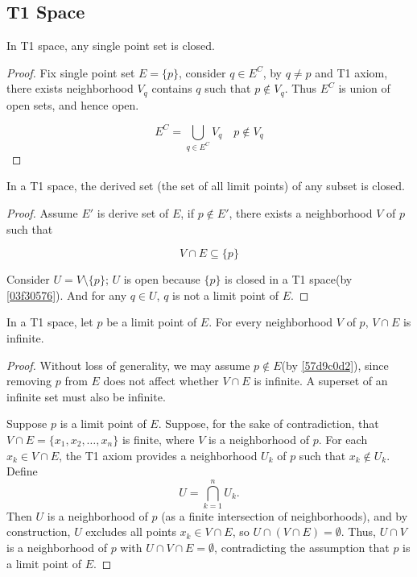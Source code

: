 \subsection{T1 Space}

\begin{thm}\label{03f30576}
    In T1 space, any single point set is closed.
\end{thm}

\begin{proof}
    Fix single point set $ E = \{ p \}$, consider $q \in E^C$, by $q \ne p$ and T1 axiom, there exists neighborhood $V_q$
    contains $q$ such that $p \notin V_q$. Thus $E^C$ is union of open sets, and hence open.

    \[
        E^C = \bigcup_{q \in E^C} V_q \quad  p \notin V_q
    \]
\end{proof}

\begin{thm}
    In a T1 space, the derived set (the set of all limit points) of any subset is closed.
\end{thm}

\begin{proof}
    Assume $E'$ is derive set of $E$, if $p \notin E'$, there exists a neighborhood $V$ of $p$ such that 

    \[
        V \cap E \subseteq \{ p \}
    \]

    Consider $U = V \setminus \{ p \}$; $U$ is open because $\{ p \}$ is closed in a T1 space(by \cref{03f30576}). And for any $q \in U$, $q$ is not a limit point of $E$.
\end{proof}

\begin{thm}\label{2dc4936a}
    In a T1 space, let $p$ be a limit point of $E$. For every neighborhood $V$ of $p$, $V \cap E$ is infinite.
\end{thm}

\begin{proof}
    Without loss of generality, we may assume $p \notin E$(by \cref{57d9c0d2}), since removing $p$ from $E$ does not affect whether $V \cap E$ is infinite. 
    A superset of an infinite set must also be infinite. 

    Suppose $p$ is a limit point of $E$. 
    Suppose, for the sake of contradiction, that $V \cap E = \{x_1, x_2, \dots, x_n\}$ is finite, where $V$ is a neighborhood of $p$.
    For each $x_k \in V \cap E$, the T1 axiom provides a neighborhood $U_k$ of $p$ such that $x_k \notin U_k$. 
    Define
    \[
        U = \bigcap_{k=1}^n U_k.
    \]
    Then $U$ is a neighborhood of $p$ (as a finite intersection of neighborhoods), and by construction, $U$ excludes all points $x_k \in V \cap E$, so $U \cap (V \cap E) = \emptyset$. 
    Thus, $U \cap V$ is a neighborhood of $p$ with $U \cap V \cap E = \emptyset$, contradicting the assumption that $p$ is a limit point of $E$.
\end{proof}


